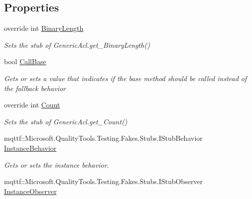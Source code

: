 \subsection*{Properties}
\begin{DoxyCompactItemize}
\item 
override int \hyperlink{class_system_1_1_security_1_1_access_control_1_1_fakes_1_1_stub_generic_acl_afcfe72bd78f5b4a5f7c309d4898fd00f}{Binary\-Length}
\begin{DoxyCompactList}\small\item\em Sets the stub of Generic\-Acl.\-get\-\_\-\-Binary\-Length()\end{DoxyCompactList}\item 
bool \hyperlink{class_system_1_1_security_1_1_access_control_1_1_fakes_1_1_stub_generic_acl_a60c8507b4791f556a73c1ba8e704f8b3}{Call\-Base}
\begin{DoxyCompactList}\small\item\em Gets or sets a value that indicates if the base method should be called instead of the fallback behavior\end{DoxyCompactList}\item 
override int \hyperlink{class_system_1_1_security_1_1_access_control_1_1_fakes_1_1_stub_generic_acl_aee6c7c276c1fa3e899d2985d2c31850c}{Count}
\begin{DoxyCompactList}\small\item\em Sets the stub of Generic\-Acl.\-get\-\_\-\-Count()\end{DoxyCompactList}\item 
mqttf\-::\-Microsoft.\-Quality\-Tools.\-Testing.\-Fakes.\-Stubs.\-I\-Stub\-Behavior \hyperlink{class_system_1_1_security_1_1_access_control_1_1_fakes_1_1_stub_generic_acl_ae7d1d884d9e5ccc03ff4c85933d9ee7c}{Instance\-Behavior}
\begin{DoxyCompactList}\small\item\em Gets or sets the instance behavior.\end{DoxyCompactList}\item 
mqttf\-::\-Microsoft.\-Quality\-Tools.\-Testing.\-Fakes.\-Stubs.\-I\-Stub\-Observer \hyperlink{class_system_1_1_security_1_1_access_control_1_1_fakes_1_1_stub_generic_acl_a0a7be334126722178b683d0be628aabb}{Instance\-Observer}

\end{DoxyCompactItemize}
